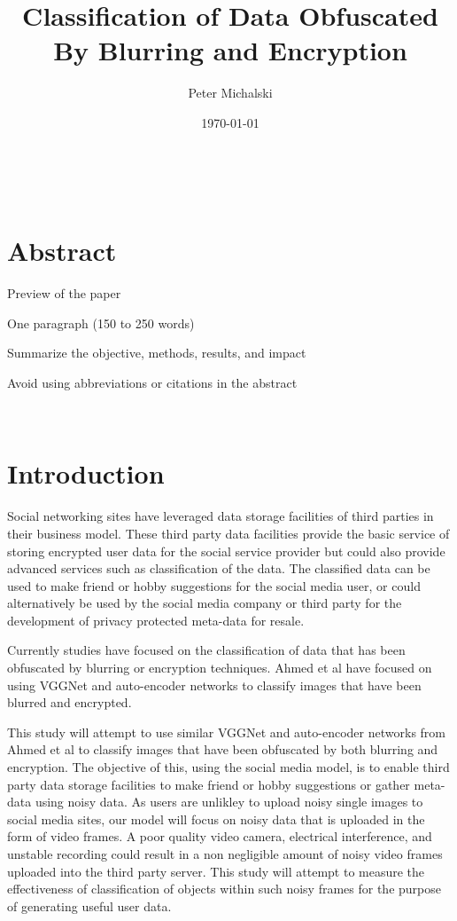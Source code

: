 \documentclass[12pt, titlepage]{article}
\begin{document}
\title{Classification of Data Obfuscated By Blurring and Encryption} 
\author{Peter Michalski}
\date{\today}

\maketitle

\newpage

\tableofcontents
{}

~\newpage
{}

\section{Abstract}

Preview of the paper

One paragraph (150 to 250 words)

Summarize the objective, methods, 
results, and impact

Avoid using abbreviations or citations 
in the abstract

~\newpage
\section{Introduction}

Social networking sites have leveraged data storage facilities of third parties in their business model. These third party data facilities provide the basic service of storing encrypted user data for the social service provider but could also provide advanced services such as classification of the data. 
The classified data can be used to make friend or hobby suggestions for the social media user, or could alternatively be used by the social media company or third party for the development of privacy protected meta-data for resale. 

Currently studies have focused on the classification of data that has been obfuscated by blurring or encryption techniques. Ahmed et al have focused on using VGGNet and auto-encoder networks to classify images that have been blurred and encrypted. 

This study will attempt to use similar VGGNet and auto-encoder networks from Ahmed et al to classify images that have been obfuscated by both blurring and encryption. The objective of this, using the social media model, is to enable third party data storage facilities to make friend or hobby suggestions or gather meta-data using noisy data. As users are unlikley to upload noisy single images to social media sites, our model will focus on noisy data that is uploaded in the form of video frames. A poor quality video camera, electrical interference, and unstable recording could result in a non negligible amount of noisy video frames uploaded into the third party server. This study will attempt to measure the effectiveness of classification of objects within such noisy frames for the purpose of generating useful user data. 
\end{document}
